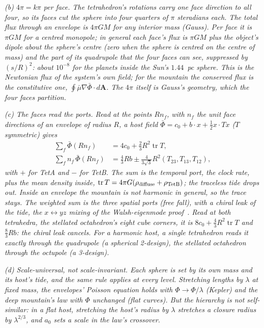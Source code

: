 \documentclass[twocolumn]{iopjournal}
\begin{document}
\emph{(b) $4\pi = k\pi$ per face. The tetrahedron's rotations carry one
face direction to all four, so its faces cut the sphere into four
quarters of $\pi$ steradians each. The total flux through an envelope
is $4\pi GM$ for any interior mass (Gauss). Per face it is $\pi GM$ for
a centred monopole; in general each face's flux is $\pi GM$ plus the
object's dipole about the sphere's centre (zero when the sphere is
centred on the centre of mass) and the part of its quadrupole that the
four faces can see, suppressed by $(s/R)^2$: about $10^{-8}$ for the
planets inside the Sun's $1.44$~pc sphere. This is the Newtonian flux
of the system's own field; for the mountain the conserved flux is the
constitutive one, $\oint\bar\mu\nabla\bar\Phi\cdot d\mathbf A$. The $4\pi$
itself is Gauss's geometry, which the four faces partition.}

\emph{(c) The faces read the ports. Read at the points $Rn_f$, with
$n_f$ the unit face directions of an envelope of radius $R$, a host
field $\bar\Phi = c_0 + b\cdot x + \tfrac12x\cdot Tx$ ($T$ symmetric) gives}
\[
\begin{aligned}
\textstyle\sum_f\bar\Phi(Rn_f) &= 4c_0 + \tfrac23R^2\operatorname{tr}T,\\
\textstyle\sum_f n_f\,\bar\Phi(Rn_f) &= \tfrac43Rb \pm \tfrac{4}{3\sqrt3}R^2(T_{23}, T_{13}, T_{12}),
\end{aligned}
\]
\emph{with $+$ for TetA and $-$ for TetB. The sum is the temporal port,
the clock rate, plus the mean density inside, $\operatorname{tr}T =
4\pi G(\rho_{\rm diffuse} + \rho_{\rm TetB})$; the traceless tide drops
out. Inside an envelope the mountain is not harmonic in general, so the
trace stays. The weighted sum is the three
spatial ports (free fall), with a chiral leak of the tide, the
$x \leftrightarrow yz$ mixing of the Walsh-eigenmode
proof~\cite{NelsonWalsh}. Read at both tetrahedra, the stellated
octahedron's eight cube corners, it is $8c_0 + \tfrac43R^2\operatorname{tr}T$
and $\tfrac83Rb$: the chiral leak cancels. For a harmonic host, a single tetrahedron reads it exactly
through the quadrupole (a spherical 2-design), the stellated octahedron
through the octupole (a 3-design).}

\emph{(d) Scale-universal, not scale-invariant. Each sphere is set by
its own mass and its host's tide, and the same rule applies at every
level. Stretching lengths by $\lambda$ at fixed mass, the envelopes'
Poisson equation holds with $\Phi \to \Phi/\lambda$ (Kepler) and the
deep mountain's law with $\Phi$ unchanged (flat curves). But the
hierarchy is not self-similar: in a flat host, stretching the host's
radius by $\lambda$ stretches a closure radius by $\lambda^{2/3}$, and
$a_0$ sets a scale in the law's crossover.}
\end{document}
